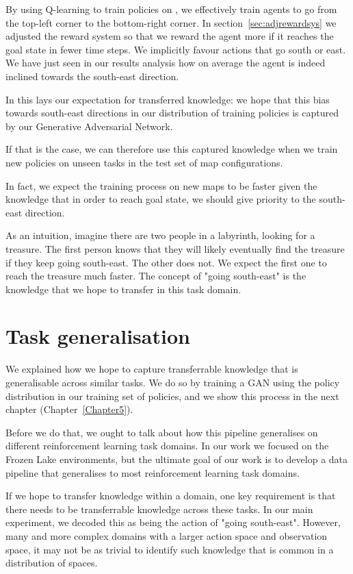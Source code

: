 By using Q-learning to train policies on , we effectively train agents to go from the top-left corner to the bottom-right corner.
In section~\ref{sec:adjrewardsys} we adjusted the reward system so that we reward the agent more if it reaches the goal state in fewer time steps. We implicitly favour actions that go south or east. We have just seen in our results analysis how on average the agent is indeed inclined towards the south-east direction.

In this lays our expectation for transferred knowledge: we hope that this bias towards south-east directions in our distribution of training policies is captured by our Generative Adversarial Network.

If that is the case, we can therefore use this captured knowledge when we train new policies on unseen tasks in the test set of map configurations.

In fact, we expect the training process on new maps to be faster given the knowledge that in order to reach goal state, we should give priority to the south-east direction.

As an intuition, imagine there are two people in a labyrinth, looking for a treasure. The first person knows that they will likely eventually find the treasure if they keep going south-east. The other does not. We expect the first one to reach the treasure much faster. The concept of "going south-east" is the knowledge that we hope to transfer in this task domain.

\section{Task generalisation}
\label{sec:taskgeneralisation}
We explained how we hope to capture transferrable knowledge that is generalisable across similar tasks. We do so by training a GAN using the policy distribution in our training set of policies, and we show this process in the next chapter (Chapter~\ref{Chapter5}).

Before we do that, we ought to talk about how this pipeline generalises on different reinforcement learning task domains. In our work we focused on the Frozen Lake environments, but the ultimate goal of our work is to develop a data pipeline that generalises to most reinforcement learning task domains.

If we hope to transfer knowledge within a domain, one key requirement is that there needs to be transferrable knowledge across these tasks. In our main experiment, we decoded this as being the action of "going south-east". However, many and more complex domains with a larger action space and observation space, it may not be as trivial to identify such knowledge that is common in a distribution of spaces.

